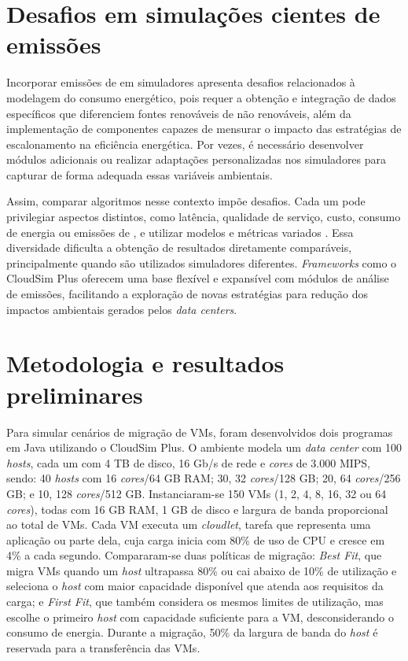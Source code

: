 \documentclass[12pt]{article}
\begin{document}
\section{Desafios em simulações cientes de emissões}
Incorporar emissões de  em simuladores apresenta desafios relacionados à modelagem do consumo energético, pois requer a obtenção e integração de dados específicos que diferenciem fontes renováveis de não renováveis, além da implementação de componentes capazes de mensurar o impacto das estratégias de escalonamento na eficiência energética. Por vezes, é necessário desenvolver módulos adicionais ou realizar adaptações personalizadas nos simuladores para capturar de forma adequada essas variáveis ambientais.

Assim, comparar algoritmos nesse contexto impõe desafios. Cada um pode privilegiar aspectos distintos, como latência, qualidade de serviço, custo, consumo de energia ou emissões de , e utilizar modelos e métricas variados \cite{kumar:19}. Essa diversidade dificulta a obtenção de resultados diretamente comparáveis, principalmente quando são utilizados simuladores diferentes. \textit{Frameworks} como o CloudSim Plus \cite{silva:17} oferecem uma base flexível e expansível com módulos de análise de emissões, facilitando a exploração de novas estratégias para redução dos impactos ambientais gerados pelos \textit{data centers}.

\section{Metodologia e resultados preliminares}

Para simular cenários de migração de VMs, foram desenvolvidos dois programas em Java utilizando o CloudSim Plus. O ambiente modela um \textit{data center} com 100 \textit{hosts}, cada um com 4 TB de disco, 16 Gb/s de rede e \textit{cores} de 3.000 MIPS, sendo: 40 \textit{hosts} com 16 \textit{cores}/64 GB RAM; 30, 32 \textit{cores}/128 GB; 20, 64 \textit{cores}/256 GB; e 10, 128 \textit{cores}/512 GB. Instanciaram-se 150 VMs (1, 2, 4, 8, 16, 32 ou 64 \textit{cores}), todas com 16 GB RAM, 1 GB de disco e largura de banda proporcional ao total de VMs. Cada VM executa um \textit{cloudlet}, tarefa que representa uma aplicação ou parte dela, cuja carga inicia com 80\% de uso de CPU e cresce em 4\% a cada segundo. Compararam-se duas políticas de migração: \textit{Best Fit}, que migra VMs quando um \textit{host} ultrapassa 80\% ou cai abaixo de 10\% de utilização e seleciona o \textit{host} com maior capacidade disponível que atenda aos requisitos da carga; e \textit{First Fit}, que também considera os mesmos limites de utilização, mas escolhe o primeiro \textit{host} com capacidade suficiente para a VM, desconsiderando o consumo de energia. Durante a migração, 50\% da largura de banda do \textit{host} é reservada para a transferência das VMs.
\end{document}
